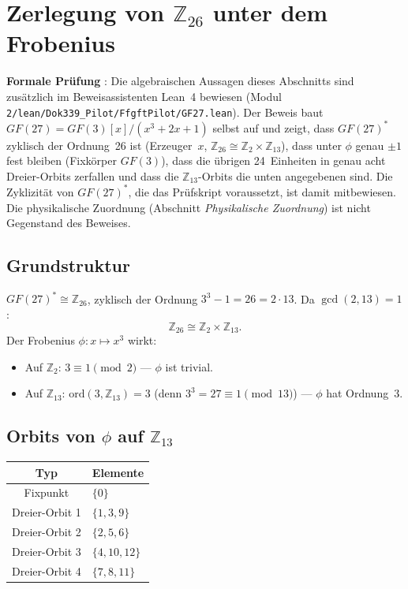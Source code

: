 \section{Zerlegung von $\mathbb{Z}_{26}$ unter dem Frobenius}

\noindent\textbf{Formale Prüfung} \LM: Die algebraischen Aussagen dieses
Abschnitts sind zusätzlich im Beweisassistenten Lean~4 bewiesen (Modul
\texttt{2/\allowbreak lean/\allowbreak Dok339\_Pilot/\allowbreak FfgftPilot/\allowbreak GF27.lean}). Der Beweis baut
$GF(27)=GF(3)[x]/(x^3+2x+1)$ selbst auf und zeigt, dass $GF(27)^*$ zyklisch
der Ordnung~26 ist (Erzeuger~$x$, $\mathbb{Z}_{26}\cong\mathbb{Z}_2\times\mathbb{Z}_{13}$),
dass unter $\phi$ genau $\pm1$ fest bleiben (Fixkörper $GF(3)$), dass die
übrigen 24~Einheiten in genau acht Dreier-Orbits zerfallen und dass die
$\mathbb{Z}_{13}$-Orbits die unten angegebenen sind. Die Zyklizität von
$GF(27)^*$, die das Prüfskript voraussetzt, ist damit mitbewiesen. Die
physikalische Zuordnung (Abschnitt \emph{Physikalische Zuordnung}) ist nicht
Gegenstand des Beweises.

\subsection{Grundstruktur \BM\,\LM}

$GF(27)^* \cong \mathbb{Z}_{26}$, zyklisch der Ordnung $3^3-1=26=2\cdot13$.
Da $\gcd(2,13)=1$:
\[
\mathbb{Z}_{26} \cong \mathbb{Z}_2 \times \mathbb{Z}_{13}.
\]
Der Frobenius $\phi: x\mapsto x^3$ wirkt:
\begin{itemize}
\item Auf $\mathbb{Z}_2$: $3\equiv1\pmod{2}$ — $\phi$ ist trivial.
\item Auf $\mathbb{Z}_{13}$: $\mathrm{ord}(3,\mathbb{Z}_{13})=3$
  (denn $3^3=27\equiv1\pmod{13}$) — $\phi$ hat Ordnung~3.
\end{itemize}

\subsection{Orbits von $\phi$ auf $\mathbb{Z}_{13}$ \BM\,\LM}

\begin{center}
\begin{tabular}{cl}
\toprule
Typ & Elemente \\
\midrule
Fixpunkt & $\{0\}$ \\
Dreier-Orbit 1 & $\{1,3,9\}$ \\
Dreier-Orbit 2 & $\{2,5,6\}$ \\
Dreier-Orbit 3 & $\{4,10,12\}$ \\
Dreier-Orbit 4 & $\{7,8,11\}$ \\
\bottomrule
\end{tabular}
\end{center}

